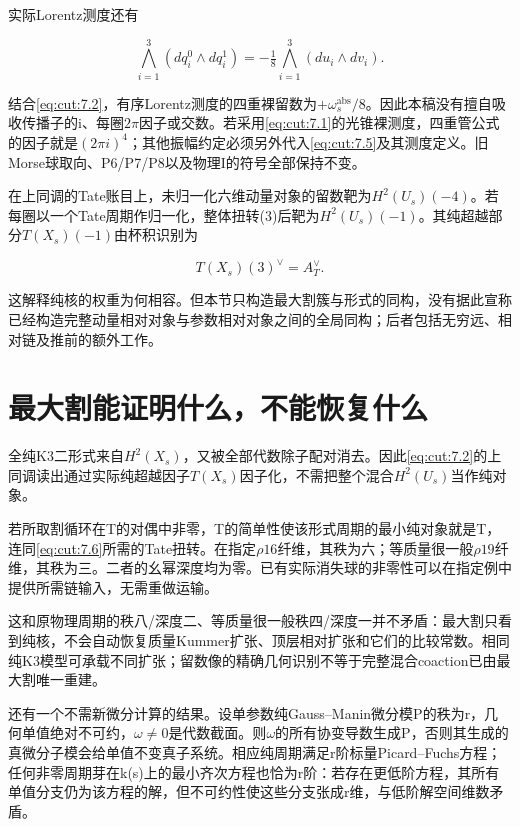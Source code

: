 \documentclass[11pt,a4paper,oneside]{ctexrep}
\theoremstyle{cnplain}
\theoremstyle{definition}
\theoremstyle{remark}
\begin{document}
实际Lorentz测度还有

\begin{equation}
\bigwedge_{i=1}^3(dq_i^0\wedge dq_i^1)
       =-\tfrac18\bigwedge_{i=1}^3(du_i\wedge dv_i).  \label{eq:cut:7.5}
\end{equation}

结合\eqref{eq:cut:7.2}，有序Lorentz测度的四重裸留数为\(+\omega _s^{\mathrm{abs}}/8\)。因此本稿没有擅自吸收传播子的i、每圈\(2\pi \)因子或交数。若采用\eqref{eq:cut:7.1}的光锥裸测度，四重管公式的因子就是\((2\pi i)^{4}\)；其他振幅约定必须另外代入\eqref{eq:cut:7.5}及其测度定义。旧Morse球取向、P6/P7/P8以及物理I的符号全部保持不变。

在上同调的Tate账目上，未归一化六维动量对象的留数靶为\(H^{2}(U_s)(- 4)\)。若每圈以一个Tate周期作归一化，整体扭转(3)后靶为\(H^{2}(U_s)(- 1)\)。其纯超越部分\(T(X_s)(- 1)\)由杯积识别为

\begin{equation}
T(X_s)(3)^\vee=A_T^\vee.            \label{eq:cut:7.6}
\end{equation}

这解释纯核的权重为何相容。但本节只构造最大割簇与形式的同构，没有据此宣称已经构造完整动量相对对象与参数相对对象之间的全局同构；后者包括无穷远、相对链及推前的额外工作。

\section{最大割能证明什么，不能恢复什么}\label{sec:cut:8}

全纯K3二形式来自\(H^{2}(X_s)\)，又被全部代数除子配对消去。因此\eqref{eq:cut:7.2}的上同调读出通过实际纯超越因子\(T(X_s)\)因子化，不需把整个混合\(H^{2}(U_s)\)当作纯对象。

若所取割循环在T的对偶中非零，T的简单性使该形式周期的最小纯对象就是T，连同\eqref{eq:cut:7.6}所需的Tate扭转。在指定\(\rho 16\)纤维，其秩为六；等质量很一般\(\rho 19\)纤维，其秩为三。二者的幺幂深度均为零。已有实际消失球的非零性可以在指定例中提供所需链输入，无需重做运输。

这和原物理周期的秩八/深度二、等质量很一般秩四/深度一并不矛盾：最大割只看到纯核，不会自动恢复质量Kummer扩张、顶层相对扩张和它们的比较常数。相同纯K3模型可承载不同扩张；留数像的精确几何识别不等于完整混合coaction已由最大割唯一重建。

还有一个不需新微分计算的结果。设单参数纯Gauss--Manin微分模P的秩为r，几何单值绝对不可约，\(\omega \ne 0\)是代数截面。则\(\omega \)的所有协变导数生成P，否则其生成的真微分子模会给单值不变真子系统。相应纯周期满足r阶标量Picard--Fuchs方程；任何非零周期芽在k(s)上的最小齐次方程也恰为r阶：若存在更低阶方程，其所有单值分支仍为该方程的解，但不可约性使这些分支张成r维，与低阶解空间维数矛盾。
\end{document}
